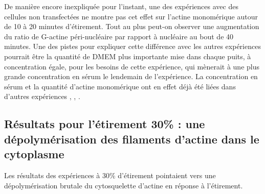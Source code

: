 De manière encore inexpliquée pour l'instant, une des expériences avec des cellules non transfectées ne montre pas cet effet sur l'actine monomérique autour de 10 à 20 minutes d'étirement. Tout au plus peut-on observer une augmentation du ratio de G-actine péri-nucléaire par rapport à nucléaire au bout de 40 minutes. Une des pistes pour expliquer cette différence avec les autres expériences pourrait être la quantité de DMEM plus importante mise dans chaque puits, à concentration égale, pour les besoins de cette expérience, qui mènerait à une plus grande concentration en sérum le lendemain de l'expérience. La concentration en sérum et la quantité d'actine monomérique ont en effet déjà été liées dans d'autres expériences \cite{mouilleron_molecular_2008}, \cite{vartiainen_nuclear_2007}, \cite{lundquist_redox_2014}.  



\subsection{Résultats pour l'étirement 30\% : une dépolymérisation des filaments d'actine dans le cytoplasme}

Les résultats des expériences à 30\% d'étirement pointaient vers une dépolymérisation brutale du cytosquelette d'actine en réponse à l'étirement. 

